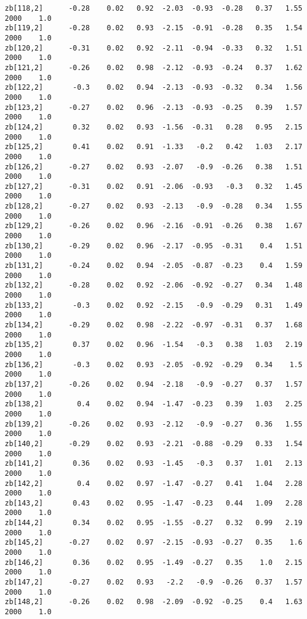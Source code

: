 \documentclass[11pt]{article}
\begin{document}
\begin{Verbatim}[commandchars=\\\{\}]
zb[118,2]      -0.28    0.02   0.92  -2.03  -0.93  -0.28   0.37   1.55   2000    1.0
zb[119,2]      -0.28    0.02   0.93  -2.15  -0.91  -0.28   0.35   1.54   2000    1.0
zb[120,2]      -0.31    0.02   0.92  -2.11  -0.94  -0.33   0.32   1.51   2000    1.0
zb[121,2]      -0.26    0.02   0.98  -2.12  -0.93  -0.24   0.37   1.62   2000    1.0
zb[122,2]       -0.3    0.02   0.94  -2.13  -0.93  -0.32   0.34   1.56   2000    1.0
zb[123,2]      -0.27    0.02   0.96  -2.13  -0.93  -0.25   0.39   1.57   2000    1.0
zb[124,2]       0.32    0.02   0.93  -1.56  -0.31   0.28   0.95   2.15   2000    1.0
zb[125,2]       0.41    0.02   0.91  -1.33   -0.2   0.42   1.03   2.17   2000    1.0
zb[126,2]      -0.27    0.02   0.93  -2.07   -0.9  -0.26   0.38   1.51   2000    1.0
zb[127,2]      -0.31    0.02   0.91  -2.06  -0.93   -0.3   0.32   1.45   2000    1.0
zb[128,2]      -0.27    0.02   0.93  -2.13   -0.9  -0.28   0.34   1.55   2000    1.0
zb[129,2]      -0.26    0.02   0.96  -2.16  -0.91  -0.26   0.38   1.67   2000    1.0
zb[130,2]      -0.29    0.02   0.96  -2.17  -0.95  -0.31    0.4   1.51   2000    1.0
zb[131,2]      -0.24    0.02   0.94  -2.05  -0.87  -0.23    0.4   1.59   2000    1.0
zb[132,2]      -0.28    0.02   0.92  -2.06  -0.92  -0.27   0.34   1.48   2000    1.0
zb[133,2]       -0.3    0.02   0.92  -2.15   -0.9  -0.29   0.31   1.49   2000    1.0
zb[134,2]      -0.29    0.02   0.98  -2.22  -0.97  -0.31   0.37   1.68   2000    1.0
zb[135,2]       0.37    0.02   0.96  -1.54   -0.3   0.38   1.03   2.19   2000    1.0
zb[136,2]       -0.3    0.02   0.93  -2.05  -0.92  -0.29   0.34    1.5   2000    1.0
zb[137,2]      -0.26    0.02   0.94  -2.18   -0.9  -0.27   0.37   1.57   2000    1.0
zb[138,2]        0.4    0.02   0.94  -1.47  -0.23   0.39   1.03   2.25   2000    1.0
zb[139,2]      -0.26    0.02   0.93  -2.12   -0.9  -0.27   0.36   1.55   2000    1.0
zb[140,2]      -0.29    0.02   0.93  -2.21  -0.88  -0.29   0.33   1.54   2000    1.0
zb[141,2]       0.36    0.02   0.93  -1.45   -0.3   0.37   1.01   2.13   2000    1.0
zb[142,2]        0.4    0.02   0.97  -1.47  -0.27   0.41   1.04   2.28   2000    1.0
zb[143,2]       0.43    0.02   0.95  -1.47  -0.23   0.44   1.09   2.28   2000    1.0
zb[144,2]       0.34    0.02   0.95  -1.55  -0.27   0.32   0.99   2.19   2000    1.0
zb[145,2]      -0.27    0.02   0.97  -2.15  -0.93  -0.27   0.35    1.6   2000    1.0
zb[146,2]       0.36    0.02   0.95  -1.49  -0.27   0.35    1.0   2.15   2000    1.0
zb[147,2]      -0.27    0.02   0.93   -2.2   -0.9  -0.26   0.37   1.57   2000    1.0
zb[148,2]      -0.26    0.02   0.98  -2.09  -0.92  -0.25    0.4   1.63   2000    1.0

\end{Verbatim}
\end{document}
